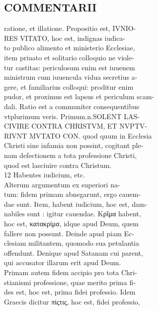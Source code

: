 \documentclass{article}
\begin{document}
\begin{pages}
\section*{COMMENTARII \\
                }ratione, et illatione. Propositio est, IVNIO- \\
                RES VITATO, hoc est, indignas iudica- \\
                to publico alimento et ministerio Ecclesiae, \\
                item priuato et solitario colloquio ne viole- \\
                tur castitas: periculosum enim est iuuenem \\
                ministrum cum iuuencula vidua secretius a- \\
                gere, et familiarius colloqui: proditur enim \\
                pudor, et proximus est lapsus et periculum scam- \\
                dali. Ratio est a communiter consequentibus \\
                vtplurimum veris. Primum.n.SOLENT LAS- \\
                CIVIRE CONTRA CHRISTVM, ET NVPTV- \\
                RIVNT MVTATO CON. quod quum in Ecclesia \\
                Christi sine infamia non possint, cogitant ple- \\
                nam defectionem a tota professione Christi, \\
                quod est lasciuire contra Christum. \\
                12 Habentes iudicium, etc. \\
                Alterum argumentum ex superiori na- \\
                tum: fidem primam abnegarunt, ergo cauem- \\
                dae sunt. Item, habent iudicium, hoc est, dam- \\
                nabiles sunt : igitur cauendae. Κρῖμα habent, \\
                hoc est, κατακρίμα, idque apud Deum, quem \\
                fallere non possunt. Deinde apud piam Ec- \\
                clesiam militantem, quomodo sua petulantia \\
                offendunt. Denique apud Satanam cui parent, \\
                qui accusator illarum erit apud Deum. \\
                Primam autem fidem accipio pro tota Chri- \\
                stianismi professione, quae merito prima fi- \\
                des est, hoc est, prima fidei professio. Idem \\
                Graecis dicitur πίςτις, hoc est, fidei professio, \\
                

\end{pages}
\end{document}
